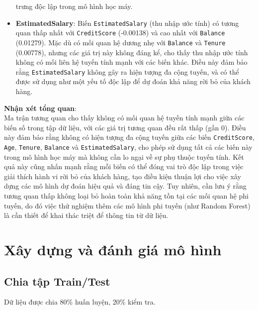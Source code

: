 \documentclass[
]{article}
\newenvironment{Shaded}{\begin{snugshade}}{\end{snugshade}}
\newcommand{\AttributeTok}[1]{\textcolor[rgb]{0.13,0.29,0.53}{#1}}
\newcommand{\ConstantTok}[1]{\textcolor[rgb]{0.56,0.35,0.01}{#1}}
\newcommand{\DecValTok}[1]{\textcolor[rgb]{0.00,0.00,0.81}{#1}}
\newcommand{\FloatTok}[1]{\textcolor[rgb]{0.00,0.00,0.81}{#1}}
\newcommand{\FunctionTok}[1]{\textcolor[rgb]{0.13,0.29,0.53}{\textbf{#1}}}
\newcommand{\NormalTok}[1]{#1}
\newcommand{\OtherTok}[1]{\textcolor[rgb]{0.56,0.35,0.01}{#1}}
\newcommand{\SpecialCharTok}[1]{\textcolor[rgb]{0.81,0.36,0.00}{\textbf{#1}}}
\begin{document}
\begin{itemize}
  trưng độc lập trong mô hình học máy.
\item
  \textbf{EstimatedSalary}: Biến \texttt{EstimatedSalary} (thu nhập ước
  tính) có tương quan thấp nhất với \texttt{CreditScore} (-0.00138) và
  cao nhất với \texttt{Balance} (0.01279). Mặc dù có mối quan hệ dương
  nhẹ với \texttt{Balance} và \texttt{Tenure} (0.00778), nhưng các giá
  trị này không đáng kể, cho thấy thu nhập ước tính không có mối liên hệ
  tuyến tính mạnh với các biến khác. Điều này đảm bảo rằng
  \texttt{EstimatedSalary} không gây ra hiện tượng đa cộng tuyến, và có
  thể được sử dụng như một yếu tố độc lập để dự đoán khả năng rời bỏ của
  khách hàng.
\end{itemize}

\textbf{Nhận xét tổng quan}:\\
Ma trận tương quan cho thấy không có mối quan hệ tuyến tính mạnh giữa
các biến số trong tập dữ liệu, với các giá trị tương quan đều rất thấp
(gần 0). Điều này đảm bảo rằng không có hiện tượng đa cộng tuyến giữa
các biến \texttt{CreditScore}, \texttt{Age}, \texttt{Tenure},
\texttt{Balance} và \texttt{EstimatedSalary}, cho phép sử dụng tất cả
các biến này trong mô hình học máy mà không cần lo ngại về sự phụ thuộc
tuyến tính. Kết quả này cũng nhấn mạnh rằng mỗi biến có thể đóng vai trò
độc lập trong việc giải thích hành vi rời bỏ của khách hàng, tạo điều
kiện thuận lợi cho việc xây dựng các mô hình dự đoán hiệu quả và đáng
tin cậy. Tuy nhiên, cần lưu ý rằng tương quan thấp không loại bỏ hoàn
toàn khả năng tồn tại các mối quan hệ phi tuyến, do đó việc thử nghiệm
thêm các mô hình phi tuyến (như Random Forest) là cần thiết để khai thác
triệt để thông tin từ dữ liệu.

\section{Xây dựng và đánh giá mô hình}\label{sec-modeling}

\subsection{Chia tập Train/Test}\label{sec-split}

Dữ liệu được chia 80\% huấn luyện, 20\% kiểm tra.

\begin{Shaded}
\end{Shaded}
\end{document}
